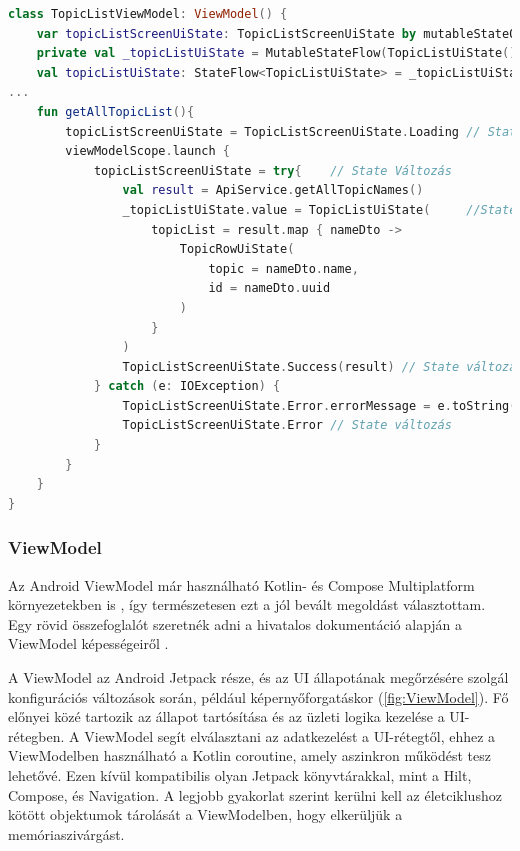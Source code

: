 \begin{lstlisting}[caption={Példa a State és StateFlow használatára.}, label={lst:state}, language=Kotlin]
class TopicListViewModel: ViewModel() {
    var topicListScreenUiState: TopicListScreenUiState by mutableStateOf(TopicListScreenUiState.Loading)
    private val _topicListUiState = MutableStateFlow(TopicListUiState())
    val topicListUiState: StateFlow<TopicListUiState> = _topicListUiState
...
    fun getAllTopicList(){
        topicListScreenUiState = TopicListScreenUiState.Loading // State változás
        viewModelScope.launch {
            topicListScreenUiState = try{    // State Változás
                val result = ApiService.getAllTopicNames()
                _topicListUiState.value = TopicListUiState(     //StateFlow változás
                    topicList = result.map { nameDto ->
                        TopicRowUiState(
                            topic = nameDto.name,
                            id = nameDto.uuid
                        )
                    }
                )
                TopicListScreenUiState.Success(result) // State változás
            } catch (e: IOException) {
                TopicListScreenUiState.Error.errorMessage = e.toString()// "Network error"
                TopicListScreenUiState.Error // State változás
            }
        }
    }
}
\end{lstlisting}


\subsubsection{ViewModel}
\label{sec:ViewModel}

Az Android ViewModel már használható Kotlin- és Compose Multiplatform környezetekben is \cite{ViewModelKMP}, így természetesen ezt a jól bevált megoldást választottam.  
Egy rövid összefoglalót szeretnék adni a hivatalos dokumentáció alapján a ViewModel képességeiről \cite{ViewModelAndroid}.

A ViewModel az Android Jetpack része, és az UI állapotának megőrzésére szolgál konfigurációs változások során, például képernyőforgatáskor (\ref{fig:ViewModel}).  
Fő előnyei közé tartozik az állapot tartósítása és az üzleti logika kezelése a UI-rétegben.  
A ViewModel segít elválasztani az adatkezelést a UI-rétegtől, ehhez a ViewModelben használható a Kotlin coroutine, amely aszinkron működést tesz lehetővé.  
Ezen kívül kompatibilis olyan Jetpack könyvtárakkal, mint a Hilt, Compose, és Navigation.  
A legjobb gyakorlat szerint kerülni kell az életciklushoz kötött objektumok tárolását a ViewModelben, hogy elkerüljük a memóriaszivárgást.  


